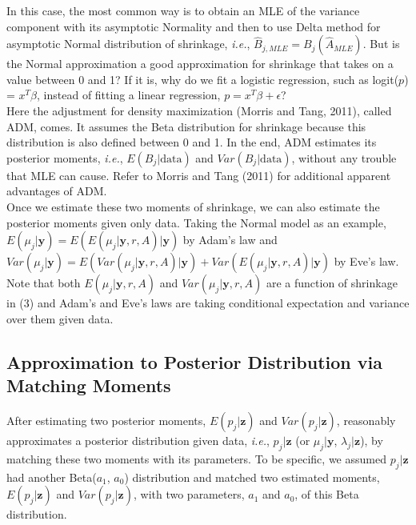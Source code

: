 \documentclass[article]{jss}
\begin{document}
In this case, the most common way is to obtain an MLE of the variance component with its asymptotic Normality and then to use Delta method for asymptotic Normal distribution of shrinkage, \emph{i.e.}, $\hat{B}_{j, MLE}=B_{j}(\hat{A}_{MLE})$. But is the Normal approximation a good approximation for shrinkage that takes on a value between 0 and 1? If it is, why do we fit a logistic regression, such as logit($p$) = $x^{T}\beta$, instead of fitting a linear regression, $p = x^{T}\beta+\epsilon$?
\\

Here the adjustment for density maximization (Morris and Tang, 2011), called ADM, comes. It assumes the Beta distribution for shrinkage because this distribution is also defined between 0 and 1. In the end, ADM  estimates its posterior moments, \emph{i.e.}, $E(B_{j}\vert\textrm{data})$ and $Var(B_{j}\vert\textrm{data})$, without any trouble that MLE can cause. Refer to Morris and Tang (2011) for additional apparent advantages of ADM.
\\

Once we estimate these two moments of shrinkage, we can also estimate the posterior moments given only data. Taking the Normal model as an example,  $E(\mu_{j}\vert \textbf{y})=E(E(\mu_{j}\vert \textbf{y}, r, A)\vert \textbf{y})$ by Adam's law and $Var(\mu_{j}\vert \textbf{y})=E(Var(\mu_{j}\vert \textbf{y}, r, A)\vert \textbf{y})+Var(E(\mu_{j}\vert \textbf{y}, r, A)\vert \textbf{y})$ by Eve's law. Note that both $E(\mu_{j}\vert \textbf{y}, r, A)$ and $Var(\mu_{j}\vert \textbf{y}, r, A)$ are a function of shrinkage in (3) and Adam's and Eve's laws are taking conditional expectation and variance over them given data.

\subsection[Approximation to Posterior Distribution by Moment Matching]{Approximation to Posterior Distribution via Matching Moments}
After estimating two posterior moments, $E(p_{j}\vert \textbf{z})$ and $Var(p_{j}\vert \textbf{z})$,  reasonably approximates a posterior distribution given data, \emph{i.e.}, $p_{j}\vert \textbf{z}$ (or $\mu_{j}\vert \textbf{y}$, $\lambda_{j}\vert \textbf{z}$), by matching these two moments with its parameters. To be specific, we assumed $p_{j}\vert \textbf{z}$ had another Beta($a_{1}$, $a_{0}$) distribution and matched two estimated moments, $E(p_{j}\vert \textbf{z})$ and $Var(p_{j}\vert \textbf{z})$, with two parameters, $a_{1}$ and $a_{0}$, of this Beta distribution. 
\end{document}
